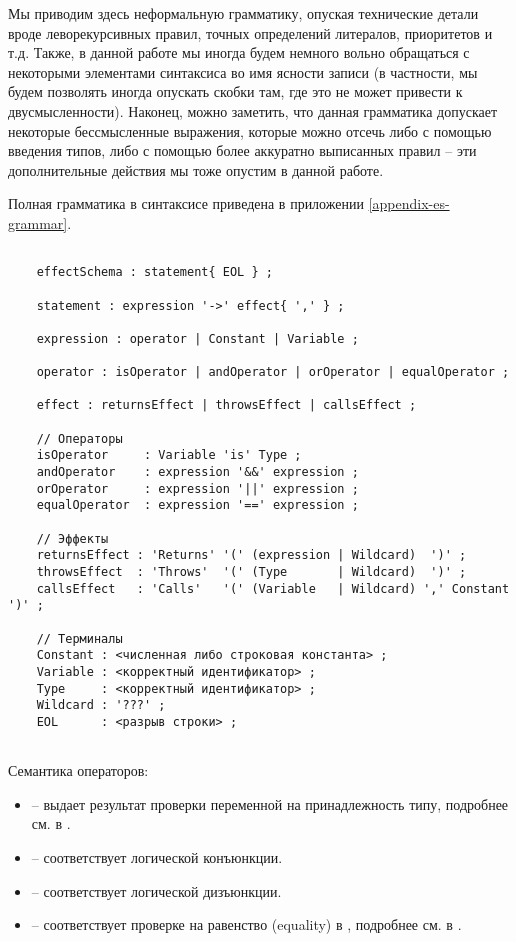 Мы приводим здесь неформальную грамматику, опуская технические детали вроде леворекурсивных правил, точных определений литералов, приоритетов и т.д. Также, в данной работе мы иногда будем немного вольно обращаться с некоторыми элементами синтаксиса во имя ясности записи (в частности, мы будем позволять иногда опускать скобки там, где это не может привести к двусмысленности). Наконец, можно заметить, что данная грамматика допускает некоторые бессмысленные выражения, которые можно отсечь либо с помощью введения типов, либо с помощью более аккуратно выписанных правил -- эти дополнительные действия мы тоже опустим в данной работе.

Полная грамматика в синтаксисе  приведена в приложении \ref{appendix-es-grammar}. 


\begin{verbatim}

    effectSchema : statement{ EOL } ;
    
    statement : expression '->' effect{ ',' } ;
    
    expression : operator | Constant | Variable ;
    
    operator : isOperator | andOperator | orOperator | equalOperator ;
    
    effect : returnsEffect | throwsEffect | callsEffect ;
      
    // Операторы
    isOperator     : Variable 'is' Type ;
    andOperator    : expression '&&' expression ;
    orOperator     : expression '||' expression ;
    equalOperator  : expression '==' expression ;
    
    // Эффекты
    returnsEffect : 'Returns' '(' (expression | Wildcard)  ')' ;
    throwsEffect  : 'Throws'  '(' (Type       | Wildcard)  ')' ;
    callsEffect   : 'Calls'   '(' (Variable   | Wildcard) ',' Constant ')' ;
    
    // Терминалы
    Constant : <численная либо строковая константа> ; 
    Variable : <корректный идентификатор> ;        
    Type     : <корректный идентификатор> ;
    Wildcard : '???' ;
    EOL      : <разрыв строки> ;
    
\end{verbatim}


Семантика операторов:

\begin{itemize}
    \item {} -- выдает результат проверки переменной на принадлежность типу, подробнее см. в \cite{kotlin:typechecks}.
    
    \item {} -- соответствует логической конъюнкции.
    
    \item {} -- соответствует логической дизъюнкции.
    
    \item {} -- соответствует проверке на равенство (equality) в , подробнее см. в \cite{kotlin:equality}.
\end{itemize}

